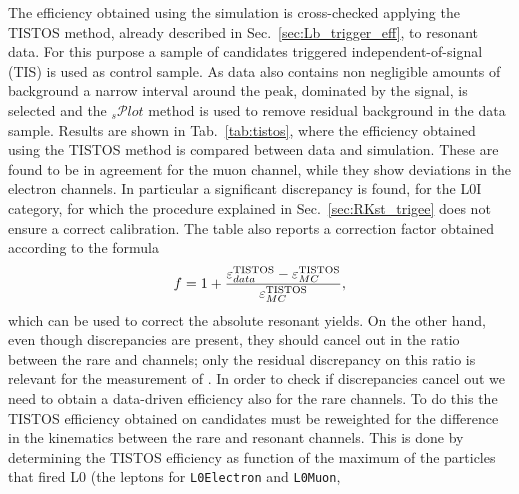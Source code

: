 The efficiency obtained using the simulation is cross-checked applying the TISTOS method, 
already described in Sec.~\ref{sec:Lb_trigger_eff}, to resonant data.
%
%
For this purpose a sample of \BdToKstJPsee candidates triggered independent-of-signal (TIS) is used
as control sample. As data also contains non negligible amounts of background 
a narrow interval around the peak, dominated by the signal, is selected and the $_{s}\mathcal{P}lot$ method
is used to remove residual background in the data sample. 
Results are shown in Tab.~\ref{tab:tistos}, where the
efficiency obtained using the TISTOS method is compared between data and simulation.
These are found to be in agreement for the muon channel,
while they show deviations in the electron channels. In particular a significant discrepancy is found,
for the L0I category, for which the procedure explained in Sec.~\ref{sec:RKst_trigee} does not ensure
a correct calibration. The table also reports a correction factor
obtained according to the formula
\begin{equation}
f = 1 + \frac{\varepsilon_{data}^{\rm TISTOS} - \varepsilon_{MC}^{\rm  TISTOS}}{\varepsilon_{MC}^{\rm  TISTOS}},
\end{equation}
which can be used to correct the absolute resonant yields.
%
On the other hand, even though discrepancies are present, they should cancel out in the ratio between the rare and \jpsi channels;
only the residual discrepancy on this ratio is relevant for the measurement of \RKst.
In order to check if discrepancies cancel out we need to obtain a data-driven efficiency
also for the rare channels. To do this the TISTOS efficiency obtained on \BdToKstJPsll candidates 
must be reweighted for the difference in the kinematics between the rare and resonant channels. This is done by determining
the TISTOS efficiency as function of the maximum \pt of the particles that fired L0 (the leptons for \verb!L0Electron! and \verb!L0Muon!,
